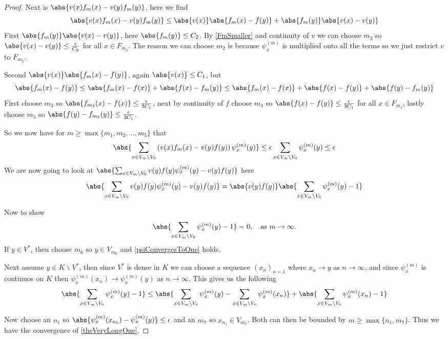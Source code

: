 \begin{proof}
	Next is $\abs{v(x) f_m(x) - v(y)f_m(y)}$, here we find
	\begin{equation}
		\abs{v(x) f_m(x) - v(y)f_m(y)} \leq \abs{v(x)}\abs{f_m(x)-f(y)} + \abs{f_m(y)}\abs{v(x)-v(y)}
	\end{equation}
	First $\abs{f_m(y)}\abs{v(x)-v(y)}$, here $\abs{f_m(y)} \leq C_2$. By \cref{FmSmaller} and continuity of $v$ we can choose $m_2$ so $\abs{v(x)-v(y)} \leq \frac{\epsilon}{C_2}$ for all $x \in F_{m_2}$. The reason we can choose $m_2$ is because $\psi_{x}^{(m)}$ is multiplied onto all the terms so we just restrict $v$ to $F_{m_2}$.
	
	Second $\abs{v(x)}\abs{f_m(x)-f(y)}$, again $\abs{v(x)} \leq C_1$, but
	\begin{equation}
		\abs{f_m(x)-f(y)} \leq \abs{f_m(x)-f(x)} + \abs{f(x) - f_m(y)} \leq \abs{f_m(x)-f(x)} + \abs{f(x) -f(y)} + \abs{f(y) - f_m(y)}
	\end{equation}
	First choose $m_3$ so $\abs{f_{m_3}(x)-f(x)} \leq \frac{\epsilon}{3 C_1}$, next by continuity of $f$ choose $m_4$ so $\abs{f(x) -f(y)} \leq \frac{\epsilon}{3 C_1}$ for all $x \in F_{m_4}$, lastly choose $m_5$ so $\abs{f(y)-f_{m_5}(y)} \leq \frac{\epsilon}{3 C_1}$.
	
	So we now have for $m \geq \max \{m_1, m_2, \ldots, m_5\}$ that
	\begin{equation}
		\abs{\sum_{x \in V_m \backslash V_0} \left(v(x) f_m(x) - v(y)f(y) \right) \psi_x^{(m)}(y)} \leq \epsilon \sum_{x \in V_m \backslash V_0} \psi_x^{(m)}(y) \leq \epsilon 
	\end{equation}
	We are now going to look at $\abs{\sum_{x \in V_m \backslash V_0} v(y) f(y) \psi_x^{(m)}(y) -v(y)f(y)}$ here
	\begin{equation}
		\abs{\sum_{x \in V_m \backslash V_0} v(y) f(y) \psi_x^{(m)}(y) -v(y)f(y)} = \abs{v(y)f(y)}\abs{\sum_{x \in V_m \backslash V_0} \psi_x^{(m)}(y) - 1}
	\end{equation}
	
	Now to show 
	\begin{equation}\label{psiConvergesToOne}
	\abs{\sum_{x \in V_m \backslash V_0} \psi_x^{(m)}(y) - 1} = 0, \quad \text{as } m \to \infty.
	\end{equation}
	If  $y \in V^*$, then choose $m_6$ so $y \in V_{m_6}$ and \ref{psiConvergesToOne} holds.
	
	Next assume $y \in K \backslash V^{*}$, then since $V^{*}$ is dense in $K$ we can choose a sequence $(x_n)_{n = 1}$ where $x_n \to y$ as $n \to \infty$, and since $\psi_{x}^{(m)}$ is continuos on $K$ then $\psi_{x}^{(m)}(x_n) \to \psi_{x}^{(m)}(y)$ as $n \to \infty$. This gives us the following
	\begin{align}
		\abs{\sum_{x \in V_m \backslash V_0} \psi_x^{(m)}(y) - 1} \leq \abs{\sum_{x \in V_m \backslash V_0} \psi_x^{(m)}(y) - \sum_{x \in V_m \backslash V_0} \psi_x^{(m)}(x_n)} + \abs{\sum_{x \in V_m \backslash V_0} \psi_x^{(m)}(x_n) - 1}
	\end{align}
	
	Now choose an $n_1$ so $\abs{\psi_{x}^{(m)}(x_{n_1}) - \psi_{x}^{(m)}(y)} \leq \epsilon$ and an $m_7$ so $x_{n_1} \in V_{m_7}$. Both can then be bounded by $m \geq \max \{n_1, m_7\}$. Thus we have the convergence of \eqref{theVeryLongOne}.
\end{proof}
